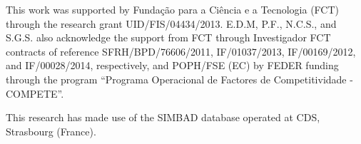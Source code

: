 \documentclass{aa}
\begin{document}
\begin{acknowledgements}

This work was supported by Funda\c{c}\~ao para a Ci\^encia e a
Tecnologia (FCT) through the research grant UID/FIS/04434/2013.
E.D.M, P.F., N.C.S., and S.G.S. also acknowledge the support from FCT
through Investigador FCT contracts of reference SFRH/BPD/76606/2011,
IF/01037/2013, IF/00169/2012, and IF/00028/2014, respectively, and
POPH/FSE (EC) by FEDER funding through the program “Programa
Operacional de Factores de Competitividade - COMPETE”.

This research has made use of the SIMBAD database operated at CDS,
Strasbourg (France).

\end{acknowledgements}






\newpage


\nocite*{}
\end{document}
